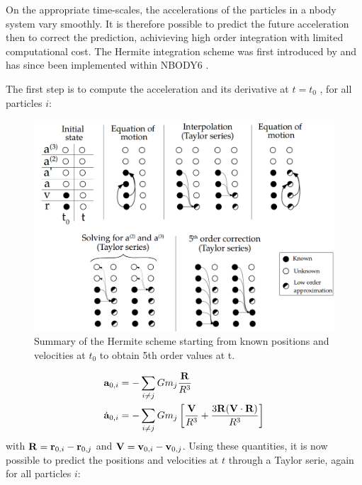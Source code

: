 On the appropriate time-scales, the accelerations of the particles in a nbody system vary smoothly. It is therefore possible to predict the future acceleration then to correct the prediction, achivieving high order integration with limited computational cost. The Hermite integration scheme was first  introduced by \cite{Makino1991} and has since been implemented within NBODY6 \citep{Aarseth2003,Nitadori2012}.


The first step is to compute the acceleration and its derivative at $t=t_0$ , for all particles $i$:

\begin{figure}
\center
\includegraphics[width=0.9\linewidth]{Figures/0_hermite_scheme.png}
\caption{Summary of the Hermite scheme starting from known positions and velocities at $t_0$ to obtain 5th order values at t.}
\label{Fig:0_hermite_scheme}
\end{figure} 
 

\begin{align}
\label{Eq:0_Hermite_acc1}
\bold{a}_{0,i} &= - \sum\limits_{i\neq j} G m_j \frac{\bold{R}}{R^3}\\
\label{Eq:0_Hermite_acc2}
\dot{\bold{a}}_{0,i} &=  - \sum\limits_{i\neq j} G m_j \left[ \frac{\bold{V}}{R^3}  + 
	\frac{ 3 \bold{R} ( \bold{V} \cdot \bold{R} )  }{R^3}\right]
\end{align}
with $\bold{R} = \bold{r}_{0,i} - \bold{r}_{0,j} $ and $\bold{V} = \bold{v}_{0,i} - \bold{v}_{0,j} $. Using these quantities, it is now possible to predict the positions and velocities at $t$ through a Taylor serie, again for all particles $i$:

